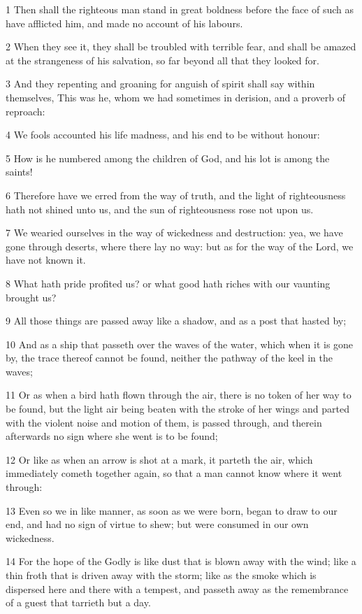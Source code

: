 \par 1 Then shall the righteous man stand in great boldness before the face of such as have afflicted him, and made no account of his labours.
\par 2 When they see it, they shall be troubled with terrible fear, and shall be amazed at the strangeness of his salvation, so far beyond all that they looked for.
\par 3 And they repenting and groaning for anguish of spirit shall say within themselves, This was he, whom we had sometimes in derision, and a proverb of reproach:
\par 4 We fools accounted his life madness, and his end to be without honour:
\par 5 How is he numbered among the children of God, and his lot is among the saints!
\par 6 Therefore have we erred from the way of truth, and the light of righteousness hath not shined unto us, and the sun of righteousness rose not upon us.
\par 7 We wearied ourselves in the way of wickedness and destruction: yea, we have gone through deserts, where there lay no way: but as for the way of the Lord, we have not known it.
\par 8 What hath pride profited us? or what good hath riches with our vaunting brought us?
\par 9 All those things are passed away like a shadow, and as a post that hasted by;
\par 10 And as a ship that passeth over the waves of the water, which when it is gone by, the trace thereof cannot be found, neither the pathway of the keel in the waves;
\par 11 Or as when a bird hath flown through the air, there is no token of her way to be found, but the light air being beaten with the stroke of her wings and parted with the violent noise and motion of them, is passed through, and therein afterwards no sign where she went is to be found;
\par 12 Or like as when an arrow is shot at a mark, it parteth the air, which immediately cometh together again, so that a man cannot know where it went through:
\par 13 Even so we in like manner, as soon as we were born, began to draw to our end, and had no sign of virtue to shew; but were consumed in our own wickedness.
\par 14 For the hope of the Godly is like dust that is blown away with the wind; like a thin froth that is driven away with the storm; like as the smoke which is dispersed here and there with a tempest, and passeth away as the remembrance of a guest that tarrieth but a day.
